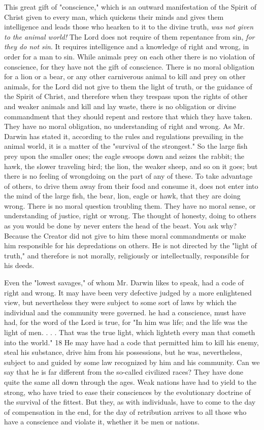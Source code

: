 This great gift of "conscience," which is an outward manifestation of the Spirit of Christ
given to every man, which quickens their minds and gives them intelligence and leads those
who hearken to it to the divine truth, \textit{was not given to the animal world!} The Lord does not
require of them repentance from sin, \textit{for they do not sin}. It requires intelligence and a
knowledge of right and wrong, in order for a man to sin. While animals prey on each other
there is no violation of conscience, for they have not the gift of conscience. There is no moral
obligation for a lion or a bear, or any other carniverous animal to kill and prey on other
animals, for the Lord did not give to them the light of truth, or the guidance of the Spirit of
Christ, and therefore when they trespass upon the rights of other and weaker animals and kill
and lay waste, there is no obligation or divine commandment that they should repent and
restore that which they have taken. They have no moral obligation, no understanding of right
and wrong. As Mr. Darwin has stated it, according to the rules and regulations prevailing in
the animal world, it is a matter of the "survival of the strongest." So the large fish prey upon
the smaller ones; the eagle swoops down and seizes the rabbit; the hawk, the slower traveling
bird; the lion, the weaker sheep, and so on it goes; but there is no feeling of wrongdoing on
the part of any of these. To take advantage of others, to drive them away from their food and
consume it, does not enter into the mind of the large fish, the bear, lion, eagle or hawk, that
they are doing wrong. There is no moral question troubling them. They have no moral sense,
or understanding of justice, right or wrong. The thought of honesty, doing to others as you
would be done by never enters the head of the beast. You ask why? Because the Creator did
not give to him these moral commandments or make him responsible for his depredations on
others. He is not directed by the "light of truth," and therefore is not morally, religiously or
intellectually, responsible for his deeds.

Even the "lowest savages," of whom Mr. Darwin likes to speak, had a code of right and
wrong. It may have been very defective judged by a more enlightened view, but nevertheless
they were subject to some sort of laws by which the individual and the community were
governed. he had a conscience, must have had, for the word of the Lord is true, for "In him
was life; and the life was the light of men. . . . That was the true light, which lighteth every
man that cometh into the world." 18 He may have had a code that permitted him to kill his
enemy, steal his substance, drive him from his possessions, but he was, nevertheless, subject
to and guided by some law recognized by him and his community. Can we say that he is far
different from the so-called civilized races? They have done quite the same all down through
the ages. Weak nations have had to yield to the strong, who have tried to ease their
consciences by the evolutionary doctrine of the survival of the fittest. But they, as with
individuals, have to come to the day of compensation in the end, for the day of retribution
arrives to all those who have a conscience and violate it, whether it be men or nations.

